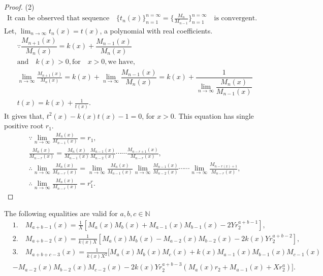 \begin{proof}(2)
\begin{align*}
\text{It can be observed that sequence} \quad \{t_{n}(x)\}_{n=1}^{n=\infty}=\{\frac{M_{n}}{M_{n-1}}\}_{n=1}^{n=\infty} \quad \text{is convergent.}
\end{align*}
Let, $\lim_{n \to \infty }t_{n}(x)=t(x)$, a polynomial with real coefficients.
\begin{align*}
&\because \dfrac{M_{n+1}(x)}{M_{n}(x)}=k(x)+\dfrac{M_{n-1}(x)}{M_{n}(x)}\\
&\text{and} \quad k(x)>0, \text{for} \quad x>0, \text {we have,}\\
&\lim_{n \to \infty }\frac{M_{n+1}(x)}{M_{n}(x)}= k(x)+\lim_{n \to \infty }\dfrac{M_{n-1}(x)}{M_{n}(x)}= k(x)+\dfrac{1}{\lim_{n \to \infty }\dfrac{M_{n}(x)}{M_{n-1}(x)}}\\
&t(x)= k(x)+\frac{1}{t(x)}.
\end{align*}
It gives that, $t^{2}(x)-k(x)t(x)-1=0$, for $x>0$. This equation has single positive root $r_{1}$.
\begin{align*}
&\because \lim_{n \to \infty }\frac{M_{n}(x)}{M_{n-1}(x)}= r_{1},\\
&\frac{M_{n}(x)}{M_{n-r}(x)}= \frac{M_{n}(x)}{M_{n-1}(x)}\frac{M_{n-1}(x)}{M_{n-2}(x)}\cdots\cdots\frac{M_{n-r+1}(x)}{M_{n-r}(x)},\\
&\therefore\lim_{n \to \infty }\frac{M_{n}(x)}{M_{n-r}(x)}= \lim_{n \to \infty }\frac{M_{n}(x)}{M_{n-1}(x)}\lim_{n \to \infty}\frac{M_{n-1}(x)}{M_{n-2}(x)}\cdots\cdots\lim_{n \to \infty }\frac{M_{n-r(x)+1}}{M_{n-r}(x)},\\
&\therefore\lim_{n \to \infty }\frac{M_{n}(x)}{M_{n-r}(x)}= r_{1}^r.
\end{align*}
\end{proof}
\begin{theorem}
The following equalities are valid for $a,b,c\in{\mathbb{N}}$
\begin{align*}
&1.\quad M_{a+b-1}(x)= \frac{1}{X}{[M_{a}(x)M_{b}(x)+M_{a-1}(x)M_{b-1}(x)-2Yr_{2}^{a+b-1}]},\\
&2.\quad M_{a+b-2}(x)= \frac{1}{k(x)X}{[M_{a}(x)M_{b}(x)-M_{a-2}(x)M_{b-2}(x)-2k(x)Yr_{2}^{a+b-2}]},\\
&3.\quad M_{a+b+c-3}(x)= \frac{1}{k(x)X^2}[M_{a}(x)M_{b}(x)M_{c}(x)+k(x)M_{a-1}(x)M_{b-1}(x)M_{c-1}(x)\\&-M_{a-2}(x)M_{b-2}(x)M_{c-2}(x)-2k(x)Yr_{2}^{a+b-3}{(M_{a}(x)r_{2}+M_{a-1}(x)+Xr_{2}^a)}].
\end{align*}
\end{theorem}
